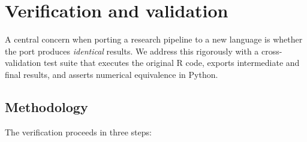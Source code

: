 \documentclass[a4paper]{elsarticle}
\begin{document}
\section{Verification and validation}
\label{sec:verification}

A central concern when porting a research pipeline to a new language
is whether the port produces \emph{identical} results.
We address this rigorously with a cross-validation test suite that
executes the original R code, exports intermediate and final results,
and asserts numerical equivalence in Python.

\subsection{Methodology}

The verification proceeds in three steps:
\end{document}
